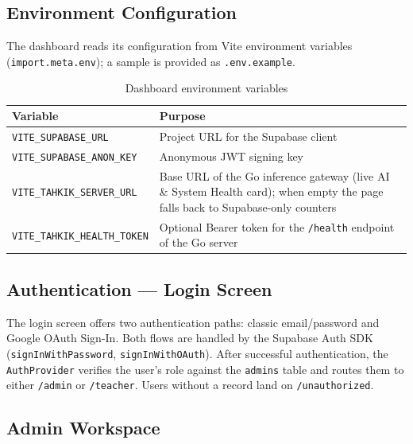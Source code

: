 \subsection{Environment Configuration}

The dashboard reads its configuration from Vite environment variables (\texttt{import.meta.env}); a sample is provided as \texttt{.env.example}.

\begin{table}[H]
  \centering
  \caption{Dashboard environment variables}
  \label{tab:impl_dash_env}
  \renewcommand{\arraystretch}{1.3}
  \begin{tabular}{lp{8.5cm}}
    \toprule
    \textbf{Variable} & \textbf{Purpose} \\
    \midrule
    \texttt{VITE\_SUPABASE\_URL}        & Project URL for the Supabase client \\
    \texttt{VITE\_SUPABASE\_ANON\_KEY}  & Anonymous JWT signing key \\
    \texttt{VITE\_TAHKIK\_SERVER\_URL}  & Base URL of the Go inference gateway (live AI \& System Health card); when empty the page falls back to Supabase-only counters \\
    \texttt{VITE\_TAHKIK\_HEALTH\_TOKEN} & Optional Bearer token for the \texttt{/health} endpoint of the Go server \\
    \bottomrule
  \end{tabular}
\end{table}

\subsection{Authentication — Login Screen}

The login screen offers two authentication paths: classic email/password and Google OAuth Sign-In. Both flows are handled by the Supabase Auth SDK (\texttt{signInWithPassword}, \texttt{signInWithOAuth}). After successful authentication, the \texttt{AuthProvider} verifies the user's role against the \texttt{admins} table and routes them to either \texttt{/admin} or \texttt{/teacher}. Users without a record land on \texttt{/unauthorized}.


\subsection{Admin Workspace}

